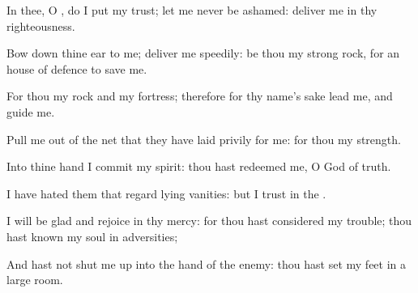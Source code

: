 {\Q {}In thee, O
{}, do I put my
trust; let me
never be
ashamed:
deliver me in thy
righteousness.


\par }{\Q {}Bow
down thine
ear to me;
deliver me
speedily: be thou my
strong
rock, for an
house of
defence to
save me.


\par }{\Q {}For thou
{} my
rock and my
fortress; therefore for thy
name’s sake
lead me, and
guide me.


\par }{\Q {}Pull me
out of the
net
that they have laid
privily for me: for thou
{} my
strength.


\par }{\Q {}Into thine
hand I
commit my
spirit: thou hast
redeemed me, O
{}
God of
truth.


\par }{\Q {}I have
hated them that
regard
lying
vanities: but I
trust in the
{}.


\par }{\Q {}I will be
glad and
rejoice in thy
mercy: for thou hast
considered my
trouble; thou hast
known my
soul in
adversities;


\par }{\Q {}And hast not shut me
up into the
hand of the
enemy: thou hast
set my
feet in a large
room.


\par }{\BB \par }
